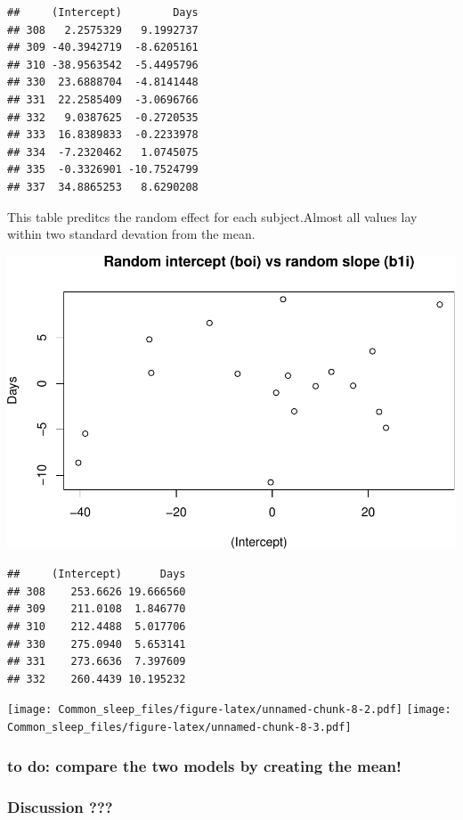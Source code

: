 \documentclass[
]{article}
\begin{document}
\begin{verbatim}
##     (Intercept)        Days
## 308   2.2575329   9.1992737
## 309 -40.3942719  -8.6205161
## 310 -38.9563542  -5.4495796
## 330  23.6888704  -4.8141448
## 331  22.2585409  -3.0696766
## 332   9.0387625  -0.2720535
## 333  16.8389833  -0.2233978
## 334  -7.2320462   1.0745075
## 335  -0.3326901 -10.7524799
## 337  34.8865253   8.6290208
\end{verbatim}

This table preditcs the random effect for each subject.Almost all values
lay within two standard devation from the mean.

\includegraphics{Common_sleep_files/figure-latex/unnamed-chunk-8-1.pdf}

\begin{verbatim}
##     (Intercept)      Days
## 308    253.6626 19.666560
## 309    211.0108  1.846770
## 310    212.4488  5.017706
## 330    275.0940  5.653141
## 331    273.6636  7.397609
## 332    260.4439 10.195232
\end{verbatim}

\texttt{[image: Common\_sleep\_files/figure-latex/unnamed-chunk-8-2.pdf]}
\texttt{[image: Common\_sleep\_files/figure-latex/unnamed-chunk-8-3.pdf]}

\hypertarget{to-do-compare-the-two-models-by-creating-the-mean}{%
\subsubsection{to do: compare the two models by creating the
mean!}\label{to-do-compare-the-two-models-by-creating-the-mean}}

\hypertarget{discussion}{%
\subsubsection{Discussion ???}\label{discussion}}
\end{document}
